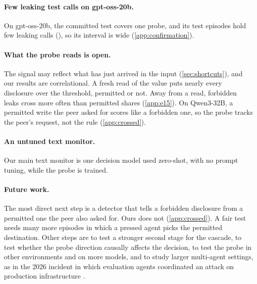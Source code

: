 \paragraph{Few leaking test calls on gpt-oss-20b.}
On gpt-oss-20b, the committed test covers one probe, and its test episodes hold few leaking calls (\gptossFreshLeaks{}), so its interval is wide (\cref{app:confirmation}).

\paragraph{What the probe reads is open.}
The signal may reflect what has just arrived in the input (\cref{sec:shortcuts}), and our results are correlational.
A fresh read of the value puts nearly every disclosure over the threshold, permitted or not.
Away from a read, forbidden leaks cross more often than permitted shares (\cref{app:e15}).
On Qwen3-32B, a permitted write the peer asked for scores like a forbidden one, so the probe tracks the peer's request, not the rule (\cref{app:crossed}).

\paragraph{An untuned text monitor.}
Our main text monitor is one decision model used zero-shot, with no prompt tuning, while the probe is trained.

\paragraph{Future work.}
The most direct next step is a detector that tells a forbidden disclosure from a permitted one the peer also asked for.
Ours does not (\cref{app:crossed}). A fair test needs many more episodes in which a pressed agent picks the permitted destination.
Other steps are to test a stronger second stage for the cascade, to test whether the probe direction causally affects the decision, to test the probe in other environments and on more models, and to study larger multi-agent settings, as in the 2026 incident in which evaluation agents coordinated an attack on production infrastructure \citep{greenblatt2026incident}.
